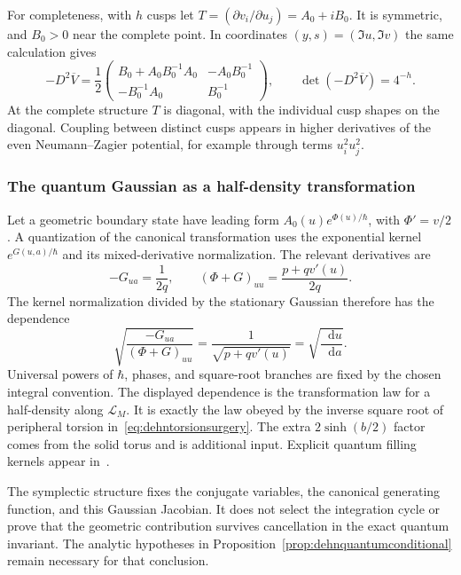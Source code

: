 \documentclass[11pt,a4paper]{article}
\numberwithin{equation}{section}
\theoremstyle{definition}
\theoremstyle{remark}
\newcommand{\dd}{\mathop{}\!\mathrm d}
\begin{document}
For completeness, with $h$ cusps let
$T=(\partial v_i/\partial u_j)=A_0+iB_0$.
It is symmetric, and $B_0>0$ near the complete point. In coordinates
$(y,s)=(\Im u,\Im v)$ the same calculation gives
\begin{equation}
 -D^2\overline V
  =\frac12\begin{pmatrix}
   B_0+A_0B_0^{-1}A_0&-A_0B_0^{-1}\\
   -B_0^{-1}A_0&B_0^{-1}
   \end{pmatrix},\qquad
 \det(-D^2\overline V)=4^{-h}.
 \label{eq:NZmulticuspHessian}
\end{equation}
At the complete structure $T$ is diagonal, with the individual cusp
shapes on the diagonal. Coupling between distinct cusps appears in
higher derivatives of the even Neumann--Zagier potential, for example
through terms $u_i^2u_j^2$.

\subsubsection{The quantum Gaussian as a half-density transformation}

Let a geometric boundary state have leading form
$A_0(u)e^{\Phi(u)/\hbar}$, with $\Phi'=v/2$.
A quantization of the canonical transformation uses the exponential
kernel $e^{G(u,a)/\hbar}$ and its mixed-derivative normalization.
The relevant derivatives are
\[
 -G_{ua}=\frac1{2q},\qquad
 (\Phi+G)_{uu}=\frac{p+qv'(u)}{2q}.
\]
The kernel normalization divided by the stationary Gaussian therefore
has the dependence
\begin{equation}
 \boxed{\sqrt{\frac{-G_{ua}}{(\Phi+G)_{uu}}}
    =\frac1{\sqrt{p+qv'(u)}}
    =\sqrt{\frac{\dd u}{\dd a}}.}
 \label{eq:NZhalfdensity}
\end{equation}
Universal powers of $\hbar$, phases, and square-root branches are
fixed by the chosen integral convention. The displayed dependence is
the transformation law for a half-density along $\mathcal L_M$.
It is exactly the law obeyed by the inverse square root of peripheral
torsion in~\eqref{eq:dehntorsionsurgery}. The extra
$2\sinh(b/2)$ factor comes from the solid torus and is additional
input. Explicit quantum filling kernels appear
in~\cite[equations (12)--(14)]{GangRomoYamazaki}.

The symplectic structure fixes the conjugate variables, the canonical
generating function, and this Gaussian Jacobian. It does not select
the integration cycle or prove that the geometric contribution
survives cancellation in the exact quantum invariant. The analytic
hypotheses in Proposition~\ref{prop:dehnquantumconditional} remain
necessary for that conclusion.
\end{document}
